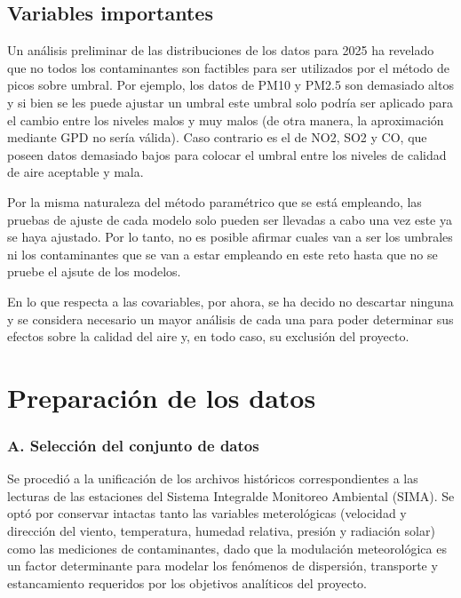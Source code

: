 \documentclass[11pt]{article}
\begin{document}
\subsection{Variables importantes}

Un análisis preliminar de las distribuciones de los datos para 2025 ha revelado que no todos los contaminantes son factibles para ser utilizados por el método de picos sobre umbral. Por ejemplo, los datos de PM10 y PM2.5 son demasiado altos y si bien se les puede ajustar un umbral este umbral solo podría ser aplicado para el cambio entre los niveles malos y muy malos (de otra manera, la aproximación mediante GPD no sería válida). Caso contrario es el de NO2, SO2 y CO, que poseen datos demasiado bajos para colocar el umbral entre los niveles de calidad de aire aceptable y mala.

Por la misma naturaleza del método paramétrico que se está empleando, las pruebas de ajuste de cada modelo solo pueden ser llevadas a cabo una vez este ya se haya ajustado. Por lo tanto, no es posible afirmar cuales van a ser los umbrales ni los contaminantes que se van a estar empleando en este reto hasta que no se pruebe el ajsute de los modelos.

En lo que respecta a las covariables, por ahora, se ha decido no descartar ninguna y se considera necesario un mayor análisis de cada una para poder determinar sus efectos sobre la calidad del aire y, en todo caso, su exclusión del proyecto.

\section{Preparación de los datos}

\subsubsection*{A. Selección del conjunto de datos}

Se procedió a la unificación de los archivos históricos correspondientes a las lecturas de las estaciones del Sistema Integralde Monitoreo Ambiental (SIMA). Se optó por conservar intactas tanto las variables meterológicas (velocidad y dirección del viento, temperatura, humedad relativa, presión y radiación solar) como las mediciones de contaminantes, dado que la modulación meteorológica es un factor determinante para modelar los fenómenos de dispersión, transporte y estancamiento requeridos por los objetivos analíticos del proyecto.
\end{document}
